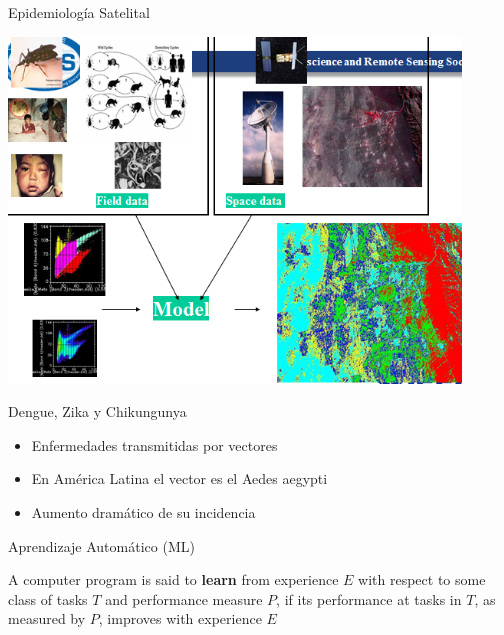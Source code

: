 \documentclass[10pt]{beamer}
\begin{document}
\begin{frame}{Epidemiología Satelital}
  \begin{center}
    \includegraphics[width=0.9\textwidth]{global.png}
  \end{center}
\end{frame}

\begin{frame}{Dengue, Zika y Chikungunya}

  \begin{itemize}[<+->]
  \item Enfermedades transmitidas por vectores
  \item En América Latina el vector es el Aedes aegypti
  \item Aumento dramático de su incidencia
  \end{itemize}

\end{frame}

\begin{frame}{Aprendizaje Automático (ML)}

    \begin{displayquote}
      A computer program is said to \textbf{learn} from experience $E$ with
      respect to some class of tasks $T$ and performance measure $P$, if its
      performance at tasks in $T$, as measured by $P$, improves with experience $E$
    \end{displayquote}


\end{frame}
\end{document}
